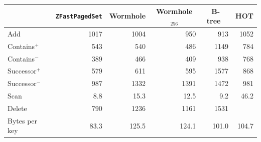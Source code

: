\begin{tabular}{lrrrrr}
&\multicolumn{1}{c}{\texttt{ZFastPagedSet}}&\multicolumn{1}{c}{Wormhole}&\multicolumn{1}{c}{Wormhole$_{256}$}&\multicolumn{1}{c}{B-tree~\cite{Muller2025BTrees}}&\multicolumn{1}{c}{HOT}\\
\hline
Add & 1017 & 1004 & 950 & 913 & 1052\\
Contains$^+$ & 543 & 540 & 486 & 1149 & 784\\
Contains$^-$ & 389 & 466 & 409 & 938 & 768\\
Successor$^+$ & 579 & 611 & 595 & 1577 & 868\\
Successor$^-$ & 987 & 1332 & 1391 & 1472 & 981\\
Scan & 8.8 & 15.3 & 12.5 & 9.2 & 46.2\\
Delete & 790 & 1236 & 1161 & 1531 & \\
\hline
Bytes per key & 83.3 & 125.5 & 124.1 & 101.0 & 104.7\\
\end{tabular}
